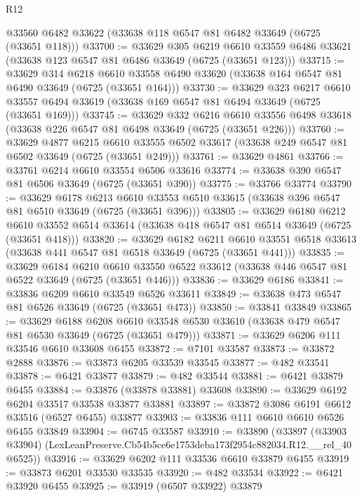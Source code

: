 \begin{lexlean}{R12}
\begin{coremodule}
    @33560
    @6482
    @33622
    (@33638 @118 @6547 @81 @6482 @33649 (@6725 (@33651 @118)))
@33700 := @33629
    @305
    @6219
    @6610
    @33559
    @6486
    @33621
    (@33638 @123 @6547 @81 @6486 @33649 (@6725 (@33651 @123)))
@33715 := @33629
    @314
    @6218
    @6610
    @33558
    @6490
    @33620
    (@33638 @164 @6547 @81 @6490 @33649 (@6725 (@33651 @164)))
@33730 := @33629
    @323
    @6217
    @6610
    @33557
    @6494
    @33619
    (@33638 @169 @6547 @81 @6494 @33649 (@6725 (@33651 @169)))
@33745 := @33629
    @332
    @6216
    @6610
    @33556
    @6498
    @33618
    (@33638 @226 @6547 @81 @6498 @33649 (@6725 (@33651 @226)))
@33760 := @33629
    @4877
    @6215
    @6610
    @33555
    @6502
    @33617
    (@33638 @249 @6547 @81 @6502 @33649 (@6725 (@33651 @249)))
@33761 := @33629 @4861
@33766 := @33761 @6214 @6610 @33554 @6506 @33616
@33774 := @33638 @390 @6547 @81 @6506 @33649 (@6725 (@33651 @390))
@33775 := @33766 @33774
@33790 := @33629
    @6178
    @6213
    @6610
    @33553
    @6510
    @33615
    (@33638 @396 @6547 @81 @6510 @33649 (@6725 (@33651 @396)))
@33805 := @33629
    @6180
    @6212
    @6610
    @33552
    @6514
    @33614
    (@33638 @418 @6547 @81 @6514 @33649 (@6725 (@33651 @418)))
@33820 := @33629
    @6182
    @6211
    @6610
    @33551
    @6518
    @33613
    (@33638 @441 @6547 @81 @6518 @33649 (@6725 (@33651 @441)))
@33835 := @33629
    @6184
    @6210
    @6610
    @33550
    @6522
    @33612
    (@33638 @446 @6547 @81 @6522 @33649 (@6725 (@33651 @446)))
@33836 := @33629 @6186
@33841 := @33836 @6209 @6610 @33549 @6526 @33611
@33849 := @33638 @473 @6547 @81 @6526 @33649 (@6725 (@33651 @473))
@33850 := @33841 @33849
@33865 := @33629
    @6188
    @6208
    @6610
    @33548
    @6530
    @33610
    (@33638 @479 @6547 @81 @6530 @33649 (@6725 (@33651 @479)))
@33871 := @33629 @6206 @111 @33546 @6610 @33608 @6455
@33872 := @7101 @33587
@33873 := @33872 @2888
@33876 := @33873 @6205 @33539 @33545
@33877 := @482 @33541
@33878 := @6421 @33877
@33879 := @482 @33544
@33881 := @6421 @33879 @6455
@33884 := @33876 (@33878 @33881) @33608
@33890 := @33629 @6192 @6204 @33517 @33538 @33877 @33881
@33897 := @33872 @3086 @6191 @6612 @33516 (@6527 @6455) @33877
@33903 := @33836 @111 @6610 @6610 @6526 @6455 @33849
@33904 := @6745 @33587
@33910 := @33890
    (@33897 (@33903 @33904) (LexLeanPreserve.Cb54b5ce6e1753deba173f2954c882034.R12.__rel_40 @6525))
@33916 := @33629 @6202 @111 @33536 @6610 @33879 @6455
@33919 := @33873 @6201 @33530 @33535
@33920 := @482 @33534
@33922 := @6421 @33920 @6455
@33925 := @33919 (@6507 @33922) @33879

\end{coremodule}
\end{lexlean}
